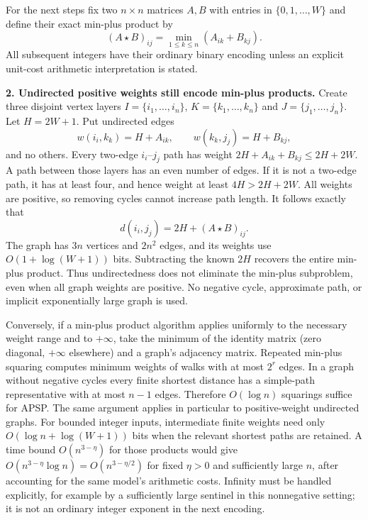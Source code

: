\documentclass[11pt,a4paper]{article}
\numberwithin{equation}{section}
\begin{document}
For the next steps fix two $n\times n$ matrices $A,B$ with entries in
$\{0,1,\ldots,W\}$ and define their exact min-plus product by
\[
 (A\star B)_{ij}=\min_{1\leq k\leq n}(A_{ik}+B_{kj}).
\]
All subsequent integers have their ordinary binary encoding unless an
explicit unit-cost arithmetic interpretation is stated.

\textbf{2. Undirected positive weights still encode min-plus products.}
Create three disjoint vertex layers $I=\{i_1,\ldots,i_n\}$,
$K=\{k_1,\ldots,k_n\}$ and $J=\{j_1,\ldots,j_n\}$. Let
$H=2W+1$. Put undirected edges
\[
 w(i_i,k_k)=H+A_{ik},\qquad w(k_k,j_j)=H+B_{kj},
\]
and no others. Every two-edge $i_i$--$j_j$ path has weight
$2H+A_{ik}+B_{kj}\leq2H+2W$. A path between those layers has an even
number of edges. If it is not a two-edge path, it has at least four,
and hence weight at least $4H>2H+2W$. All weights are positive, so
removing cycles cannot increase path length. It follows exactly that
\begin{equation}\label{30006803:gadget}
 d(i_i,j_j)=2H+(A\star B)_{ij}.
\end{equation}
The graph has $3n$ vertices and $2n^2$ edges, and its weights use
$O(1+\log(W+1))$ bits. Subtracting the known $2H$ recovers the entire
min-plus product. Thus undirectedness does not eliminate the min-plus
subproblem, even when all graph weights are positive. No negative cycle,
approximate path, or implicit exponentially large graph is used.

Conversely, if a min-plus product algorithm applies uniformly to the
necessary weight range and to $+\infty$, take the minimum of the identity
matrix (zero diagonal, $+\infty$ elsewhere) and a graph's adjacency
matrix. Repeated min-plus squaring computes minimum weights of walks
with at most $2^r$ edges. In a graph without negative cycles every finite
shortest distance has a simple-path representative with at most $n-1$
edges. Therefore $O(\log n)$ squarings suffice for APSP. The same argument
applies in particular to positive-weight undirected graphs. For bounded
integer inputs, intermediate finite weights need only $O(\log n+\log
(W+1))$ bits when the relevant shortest paths are retained.
A time bound $O(n^{3-\eta})$ for those products would give
$O(n^{3-\eta}\log n)=O(n^{3-\eta/2})$ for fixed $\eta>0$ and
sufficiently large $n$, after accounting for the same model's arithmetic
costs. Infinity must be handled explicitly, for example by a sufficiently
large sentinel in this nonnegative setting; it is not an ordinary
integer exponent in the next encoding.
\end{document}
